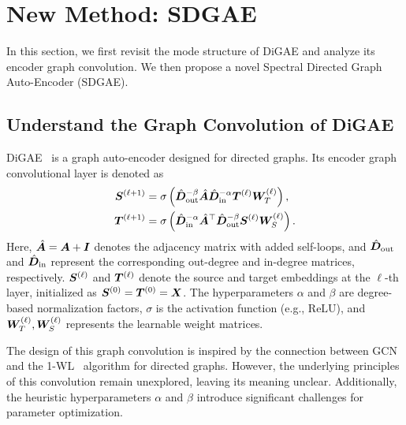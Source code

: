 

\section{New Method: SDGAE}
In this section, we first revisit the mode structure of DiGAE and analyze its encoder graph convolution. We then propose a novel Spectral Directed Graph Auto-Encoder (SDGAE).

\subsection{Understand the Graph Convolution of DiGAE}
DiGAE~\cite{digae} is a graph auto-encoder designed for directed graphs. Its encoder graph convolutional layer is denoted as %
\begin{align}
{\bm{S}}^{(\ell+1)} &= \sigma\left(\hat{{\bm{D}}}_{\rm out}^{-\beta}\hat{{\bm{A}}}\hat{{\bm{D}}}_{\rm in}^{-\alpha}{\bm{T}}^{(\ell)}{\bm{W}}_{T}^{(\ell)}\right), \label{digae_s}\\
{\bm{T}}^{(\ell+1)} &= \sigma\left(\hat{{\bm{D}}}_{\rm in}^{-\alpha}\hat{{\bm{A}}}^{\top}\hat{{\bm{D}}}_{\rm out}^{-\beta}{\bm{S}}^{(\ell)}{\bm{W}}_{S}^{(\ell)}\right).\label{digae_t}
\end{align}
Here, $\hat{{\bm{A}}} = {\bm{A}} + {\bm{I}}$ denotes the adjacency matrix with added self-loops, and $\hat{{\bm{D}}}_{\rm out}$ and $\hat{{\bm{D}}}_{\rm in}$ represent the corresponding out-degree and in-degree matrices, respectively. 
${\bm{S}}^{(\ell)}$ and ${\bm{T}}^{(\ell)}$ denote the source and target embeddings at the $\ell$-th layer, initialized as ${\bm{S}}^{(0)} = {\bm{T}}^{(0)} = {\bm{X}}$.
The hyperparameters $\alpha$ and $\beta$ are degree-based normalization factors, $\sigma$ is the activation function (e.g., $\mathrm{ReLU}$), and ${\bm{W}}_{T}^{(\ell)}, {\bm{W}}_{S}^{(\ell)}$ represents the learnable weight matrices.


The design of this graph convolution is inspired by the connection between GCN~\cite{gcn} and the 1-WL~\cite{wl} algorithm for directed graphs. However, the underlying principles of this convolution remain unexplored,  leaving its meaning unclear. Additionally, the heuristic hyperparameters $\alpha$ and $\beta$ introduce significant challenges for parameter optimization.

